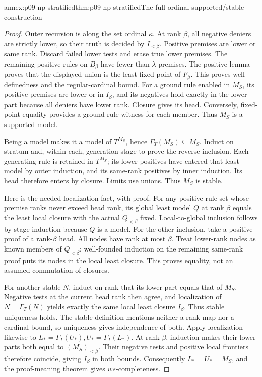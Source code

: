 \begin{annexitem}{annex:p09-np-stratified}{thm:p09-np-stratified}{The full ordinal supported/stable construction}
\begin{proof}
Outer recursion is along the set ordinal \(\kappa\). At rank
\(\beta\), all negative deniers are strictly lower, so their
truth is decided by \(I_{<\beta}\). Positive premises are lower
or same rank. Discard failed lower tests and erase true lower
premises. The remaining positive rules on \(B_\beta\) have
fewer than \(\lambda\) premises. The positive lemma proves
that the displayed union is the least fixed point of \(F_\beta\).
This proves well-definedness and the regular-cardinal bound.
For a ground rule enabled in \(M_S\), its positive premises
are lower or in \(I_\beta\), and its negatives hold exactly
in the lower part because all deniers have lower rank. Closure
gives its head. Conversely, fixed-point equality provides a ground
rule witness for each member. Thus \(M_S\) is a supported model.

Being a model makes it a model of \(T^{M_S}\), hence
\(\Gamma_T(M_S)\subseteq M_S\). Induct on stratum and,
within each, generation stage to prove the reverse inclusion.
Each generating rule is retained in \(T^{M_S}\); its lower
positives have entered that least model by outer induction, and
its same-rank positives by inner induction. Its head therefore
enters by closure. Limits use unions. Thus \(M_S\) is stable.

Here is the needed localization fact, with proof. For any positive
rule set whose premise ranks never exceed head rank, its global
least model \(Q\) at rank \(\beta\) equals the least local
closure with the actual \(Q_{<\beta}\) fixed. Local-to-global
inclusion follows by stage induction because \(Q\) is a model.
For the other inclusion, take a positive proof of a rank-\(\beta\)
head. All nodes have rank at most \(\beta\). Treat lower-rank
nodes as known members of \(Q_{<\beta}\); well-founded induction
on the remaining same-rank proof puts its nodes in the local least
closure. This proves equality, not an assumed commutation of closures.

For another stable \(N\), induct on rank that its lower part
equals that of \(M_S\). Negative tests at the current head rank
then agree, and localization of \(N=\Gamma_T(N)\) yields
exactly the same local least closure \(I_\beta\). Thus stable
uniqueness holds. The stable definition mentions neither a rank
map nor a cardinal bound, so uniqueness gives independence of both.
Apply localization likewise to
\(L_*=\Gamma_T(U_*), U_*=\Gamma_T(L_*)\). At rank
\(\beta\), induction makes their lower parts both equal to
\((M_S)_{<\beta}\). Their negative tests and positive local
frontiers therefore coincide, giving \(I_\beta\) in both bounds.
Consequently \(L_*=U_*=M_S\), and the proof-meaning theorem
gives \(ws\)-completeness.


\end{proof}
\end{annexitem}
